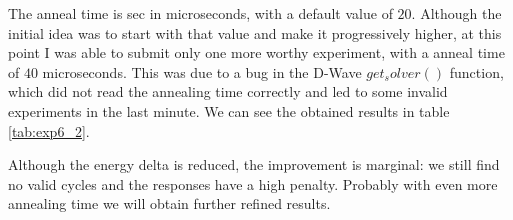 The anneal time is sec in microseconds, with a default value of $20$. Although the initial idea was to start with that value and make it progressively higher, at this point I was able to submit only one more worthy experiment, with a anneal time of $40$ microseconds. This was due to a bug in the D-Wave $get_solver()$ function, which did not read the annealing time correctly and led to some invalid experiments in the last minute. We can see the obtained results in table \ref{tab:exp6_2}.

\begin{table}[H]
	\centering
	\caption{Results of experiment 6, $10.000$ reads using different annealing times.}
	\label{tab:exp6_2}
\end{table}

Although the energy delta is reduced, the improvement is marginal: we still find no valid cycles and the responses have a high penalty. Probably with even more annealing time we will obtain further refined results.
